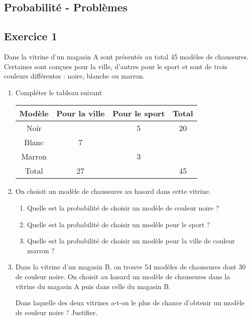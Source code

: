 \documentclass[10pt,a4paper,landscape]{article}
\begin{document}
\begin{multicols}{3}
\section*{Probabilité - Problèmes}

\subsection*{Exercice 1}
Dans la vitrine d’un magasin A sont présentés au total 45 modèles de chaussures. Certaines sont conçues pour la ville, d’autres pour le sport et sont de trois couleurs différentes : noire, blanche ou marron. 

\begin{enumerate}
\item Compléter le tableau suivant 

\begin{center}
      \begin{tabular}{|c|c|c|c|} \hline

Modèle 	&Pour la ville 	&Pour le sport 	&Total\\ \hline
Noir 	&				&5				&20\\ \hline
Blanc	&7				&				&\\ \hline
Marron	&				&3				&\\ \hline
Total 	&27				&				&45\\ \hline
\end{tabular}
\end{center}

\item On choisit un modèle de chaussures au hasard dans cette vitrine.
\begin{enumerate}
    \item Quelle est la probabilité de choisir un modèle de couleur noire ?
    \item Quelle est la probabilité de choisir un modèle pour le sport ?
    \item Quelle est la probabilité de choisir un modèle pour la ville de couleur marron ?
\end{enumerate}
\item Dans la vitrine d’un magasin B, on trouve 54 modèles de chaussures dont 30 de couleur noire. On choisit au hasard un modèle de chaussures dans la vitrine du magasin A puis dans celle du magasin B.

Dans laquelle des deux vitrines a-t-on le plus de chance d’obtenir un modèle de couleur noire ? Justifier.
\end{enumerate}  \columnbreak 

\end{multicols}
\end{document}

